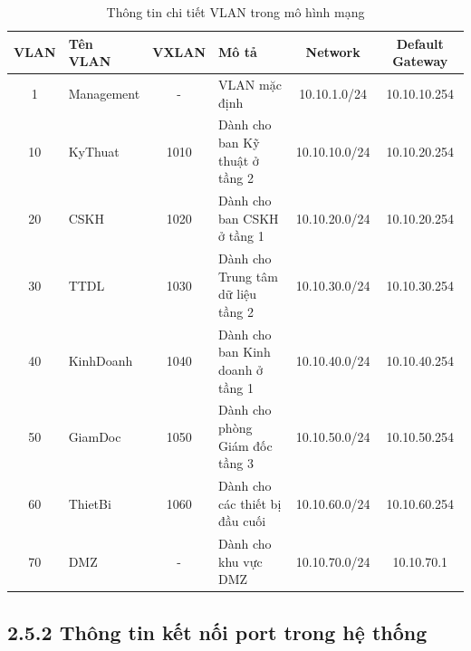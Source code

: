 \begin{table}[htbp]
\centering
\begin{tabular}{|c|l|c|l|c|c|}
\hline
\textbf{VLAN} & \textbf{Tên VLAN} & \textbf{VXLAN} &\textbf{Mô tả }& \textbf{Network} & \textbf{Default Gateway} \\
\hline
1 & Management &-& VLAN mặc định & 10.10.1.0/24 & 10.10.10.254\\
\hline
10 & KyThuat & 1010&Dành cho ban Kỹ thuật ở tầng 2 & 10.10.10.0/24 & 10.10.20.254\\
\hline
20 & CSKH & 1020& Dành cho ban CSKH ở tầng 1 & 10.10.20.0/24 & 10.10.20.254\\
\hline
30 & TTDL & 1030&Dành cho Trung tâm dữ liệu tầng 2 & 10.10.30.0/24 & 10.10.30.254\\
\hline
40 & KinhDoanh & 1040&Dành cho ban Kinh doanh ở tầng 1 & 10.10.40.0/24 & 10.10.40.254\\
\hline
50 & GiamDoc &1050& Dành cho phòng Giám đốc tầng 3& 10.10.50.0/24 & 10.10.50.254\\
\hline
60 & ThietBi &1060&Dành cho các thiết bị đầu cuối & 10.10.60.0/24 & 10.10.60.254\\
\hline
70 & DMZ & - &Dành cho khu vực DMZ & 10.10.70.0/24 & 10.10.70.1\\
\hline
\end{tabular}
\caption{Thông tin chi tiết VLAN trong mô hình mạng}
\end{table}
\newpage

\subsection*{2.5.2 Thông tin kết nối port trong hệ thống}

